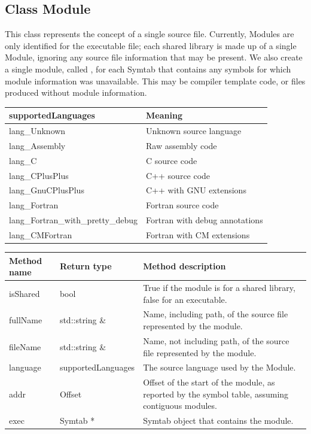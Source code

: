 \subsection{Class Module}\label{Module}


This class represents the concept of a single source file. Currently, Modules are only identified for the executable file; each shared library is made up of a single Module, ignoring any source file information that may be present. We also create a single module, called , for each Symtab that contains any symbols for which module information was unavailable. This may be compiler template code, or files produced without module information.

\begin{center}
\begin{tabular}{ll}
\toprule
supportedLanguages & Meaning \\
\midrule
lang\_Unknown & Unknown source language \\
lang\_Assembly & Raw assembly code \\
lang\_C & C source code \\
lang\_CPlusPlus & C++ source code \\
lang\_GnuCPlusPlus & C++ with GNU extensions \\
lang\_Fortran & Fortran source code \\
lang\_Fortran\_with\_pretty\_debug & Fortran with debug annotations \\
lang\_CMFortran & Fortran with CM extensions \\
\bottomrule
\end{tabular}
\end{center}

\begin{tabularx}{\textwidth}{llX}
\toprule
Method name & Return type & Method description \\
\midrule
isShared & bool & True if the module is for a shared library, false for an executable. \\
fullName & std::string \& & Name, including path, of the source file represented by the module. \\
fileName & std::string \& & Name, not including path, of the source file represented by the module. \\
language & supportedLanguages & The source language used by the Module. \\
addr & Offset & Offset of the start of the module, as reported by the symbol table, assuming contiguous modules. \\
exec & Symtab * & Symtab object that contains the module. \\
\bottomrule
\end{tabularx}


